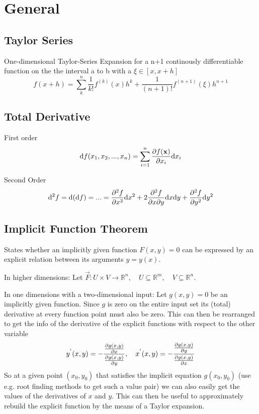 \documentclass[
    a4paper,
    11pt
]{article}
\begin{document}
\tableofcontents

\clearpage

\section{General}

\subsection{Taylor Series}

One-dimensional Taylor-Series Expansion for a n+1 continously differentiable
function on the the interval a to b with a $\xi \in [x, x+h]$
\begin{equation}
    f(x+h) = \sum_k^n \frac{1}{k!} f^{(k)}(x)h^k + \frac{1}{(n+1)!}
    f^{(n+1)}(\xi)h^{n+1}
\end{equation}

\subsection{Total Derivative}

First order
\begin{equation}
    \mathrm{d}f(x_1, x_2, ..., x_n) = \sum_{i=1}^n \pdv{f(\mathbf{x})}{x_i}
    \mathrm{d} x_i
\end{equation}

Second Order
\begin{equation}
    \mathrm{d}^2f = \mathrm{d}(\mathrm{d}f) = ... = \pdv[2]{f}{x} \mathrm{d}x^2 +
    2 \pdv[2]{f}{x}{y} \mathrm{d}x\mathrm{d}y + \pdv[2]{f}{y} \mathrm{d}y^2
\end{equation}

\subsection{Implicit Function Theorem}

States whether an implicitly given function $F(x, y) = 0$ can be expressed by an
explicit relation between its arguments $y = y(x)$.

In higher dimensions: Let $\vec{F}: U \times V \to \mathbb{R}^n, \quad U
\subseteq \mathbb{R}^m, \quad V \subseteq \mathbb{R}^n$.

In one dimensions with a two-dimensional input: Let $g(x, y) = 0$ be an
implicitly given function. Since $g$ is zero on the entire input set its (total)
derivative at every function point must also be zero. This can then be
rearranged to get the info of the derivative of the explicit functions with
respect to the other variable
\begin{equation}
    y^{'}(x, y) = - \frac{\pdv{g(x, y)}{x}}{\pdv{g(x, y)}{y}}, \quad
    x^{'}(x, y) = - \frac{\pdv{g(x, y)}{y}}{\pdv{g(x, y)}{x}}
\end{equation}
So at a given point $(x_0, y_0)$ that satisfies the implicit equation $g(x_0,
y_0)$ (use e.g. root finding methods to get such a value pair) we can also
easily get the values of the derivatives of $x$ and $y$. This can then be useful
to approximately rebuild the explicit function by the means of a Taylor
expansion.
\end{document}
